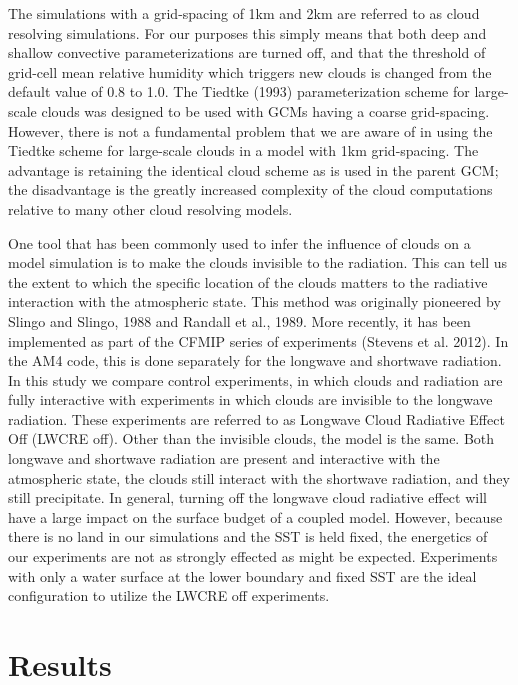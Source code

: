 \documentclass[11pt]{article}   	%
\begin{document}
The simulations with a grid-spacing of 1km and 2km are referred to as cloud resolving simulations.  For our purposes this simply means
that both deep and shallow convective parameterizations are turned off, and that the threshold of grid-cell mean relative humidity 
which triggers new clouds is changed from the default value of 0.8 to 1.0.   The Tiedtke (1993) parameterization scheme for large-scale 
clouds was designed to be used with GCMs having a coarse grid-spacing.  However, there is not a fundamental problem that we are 
aware of in using the Tiedtke scheme for large-scale clouds in a model with 1km grid-spacing.   The advantage is retaining the 
identical cloud scheme as is used in the parent GCM; the disadvantage is the greatly increased complexity of the cloud computations 
relative to many other cloud resolving models.    

One tool that has been commonly used to infer the influence of clouds on a model simulation is to make the clouds invisible to the 
radiation.  This can tell us the extent to which the specific location of the clouds matters to the radiative interaction with the atmospheric state.   This method was originally pioneered by Slingo and Slingo, 1988 and Randall et al., 1989.  More recently, it has been
implemented as part of the CFMIP series of experiments (Stevens et al. 2012).
In the AM4 code, this is done separately for the longwave and shortwave radiation.  In this study we compare control experiments, 
in which clouds and radiation are fully interactive with experiments in which clouds are
invisible to the longwave radiation.  These experiments are referred to as Longwave Cloud Radiative Effect Off (LWCRE off).  
Other than the invisible clouds, the model is the same.  Both longwave and shortwave radiation are present and interactive with 
the atmospheric state, the clouds still interact with the shortwave radiation, and they still precipitate.   
In general, turning off the longwave cloud radiative effect will have a large impact on the surface budget of a coupled model.  
However, because there is no land in our simulations and the SST is held fixed, the energetics of our experiments are not as
strongly effected as might be expected.  Experiments with only a water surface at the lower boundary and fixed SST are the
ideal configuration to utilize the LWCRE off experiments.  

\section{Results}
\end{document}

